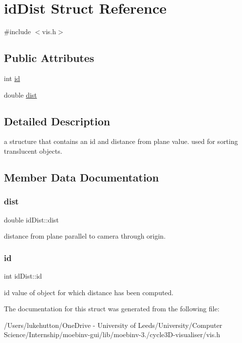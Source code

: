 \hypertarget{structid_dist}{}\section{id\+Dist Struct Reference}
\label{structid_dist}


{\ttfamily \#include $<$vis.\+h$>$}

\subsection*{Public Attributes}
\begin{DoxyCompactItemize}
\item 
int \mbox{\hyperlink{structid_dist_a444479adc980289189d07fc2303ab9f6}{id}}
\item 
double \mbox{\hyperlink{structid_dist_ab4b00d9dbea04e198c67ad6ada5f881c}{dist}}
\end{DoxyCompactItemize}


\subsection{Detailed Description}
a structure that contains an id and distance from plane value. used for sorting translucent objects. 

\subsection{Member Data Documentation}
\mbox{\label{structid_dist_ab4b00d9dbea04e198c67ad6ada5f881c}} 
\subsubsection{\texorpdfstring{dist}{dist}}
{\footnotesize\ttfamily double id\+Dist\+::dist}

distance from plane parallel to camera through origin. \mbox{\label{structid_dist_a444479adc980289189d07fc2303ab9f6}} 
\subsubsection{\texorpdfstring{id}{id}}
{\footnotesize\ttfamily int id\+Dist\+::id}

id value of object for which distance has been computed. 

The documentation for this struct was generated from the following file\+:\begin{DoxyCompactItemize}
\item 
/\+Users/lukehutton/\+One\+Drive -\/ University of Leeds/\+University/\+Computer Science/\+Internship/moebinv-\/gui/lib/moebinv-\/3./cycle3\+D-\/visualiser/vis.\+h\end{DoxyCompactItemize}
